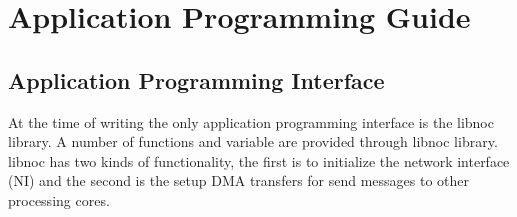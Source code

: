 \documentclass[a4paper,fontsize=10pt,twoside,DIV15,BCOR12mm,headinclude=true,footinclude=false,pagesize,bibtotoc]{scrbook}
\newcommand{\code}[1]{{\texttt{#1}}}
\newcommand{\comment}[3]{

\textsf{\textbf{#1}} {\color{#3}#2}}
\newcommand{\martin}[1]{\comment{Martin}{#1}{Blue}}
\begin{document}
%
%
%
%
%
%
%
%

\chapter{Application Programming Guide}
\label{chap:apg}

\section{Application Programming Interface}
\label{sec:api}

At the time of writing the only application programming interface is the libnoc library. A number of functions and variable are provided through libnoc library. libnoc has two kinds of functionality, the first is to initialize the network interface (NI) and the second is the setup DMA transfers for send messages to other processing cores. 
\end{document}
